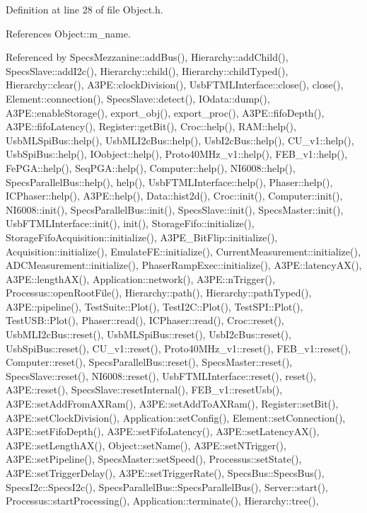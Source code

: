 Definition at line 28 of file Object.\+h.



References Object\+::m\+\_\+name.



Referenced by Specs\+Mezzanine\+::add\+Bus(), Hierarchy\+::add\+Child(), Specs\+Slave\+::add\+I2c(), Hierarchy\+::child(), Hierarchy\+::child\+Typed(), Hierarchy\+::clear(), A3\+P\+E\+::clock\+Division(), Usb\+F\+T\+M\+L\+Interface\+::close(), close(), Element\+::connection(), Specs\+Slave\+::detect(), I\+Odata\+::dump(), A3\+P\+E\+::enable\+Storage(), export\+\_\+obj(), export\+\_\+proc(), A3\+P\+E\+::fifo\+Depth(), A3\+P\+E\+::fifo\+Latency(), Register\+::get\+Bit(), Croc\+::help(), R\+A\+M\+::help(), Usb\+M\+L\+Spi\+Bus\+::help(), Usb\+M\+L\+I2c\+Bus\+::help(), Usb\+I2c\+Bus\+::help(), C\+U\+\_\+v1\+::help(), Usb\+Spi\+Bus\+::help(), I\+Oobject\+::help(), Proto40\+M\+Hz\+\_\+v1\+::help(), F\+E\+B\+\_\+v1\+::help(), Fe\+P\+G\+A\+::help(), Seq\+P\+G\+A\+::help(), Computer\+::help(), N\+I6008\+::help(), Specs\+Parallel\+Bus\+::help(), help(), Usb\+F\+T\+M\+L\+Interface\+::help(), Phaser\+::help(), I\+C\+Phaser\+::help(), A3\+P\+E\+::help(), Data\+::hist2d(), Croc\+::init(), Computer\+::init(), N\+I6008\+::init(), Specs\+Parallel\+Bus\+::init(), Specs\+Slave\+::init(), Specs\+Master\+::init(), Usb\+F\+T\+M\+L\+Interface\+::init(), init(), Storage\+Fifo\+::initialize(), Storage\+Fifo\+Acquisition\+::initialize(), A3\+P\+E\+\_\+\+Bit\+Flip\+::initialize(), Acquisition\+::initialize(), Emulate\+F\+E\+::initialize(), Current\+Measurement\+::initialize(), A\+D\+C\+Measurement\+::initialize(), Phaser\+Ramp\+Exec\+::initialize(), A3\+P\+E\+::latency\+A\+X(), A3\+P\+E\+::length\+A\+X(), Application\+::network(), A3\+P\+E\+::n\+Trigger(), Processus\+::open\+Root\+File(), Hierarchy\+::path(), Hierarchy\+::path\+Typed(), A3\+P\+E\+::pipeline(), Test\+Suite\+::\+Plot(), Test\+I2\+C\+::\+Plot(), Test\+S\+P\+I\+::\+Plot(), Test\+U\+S\+B\+::\+Plot(), Phaser\+::read(), I\+C\+Phaser\+::read(), Croc\+::reset(), Usb\+M\+L\+I2c\+Bus\+::reset(), Usb\+M\+L\+Spi\+Bus\+::reset(), Usb\+I2c\+Bus\+::reset(), Usb\+Spi\+Bus\+::reset(), C\+U\+\_\+v1\+::reset(), Proto40\+M\+Hz\+\_\+v1\+::reset(), F\+E\+B\+\_\+v1\+::reset(), Computer\+::reset(), Specs\+Parallel\+Bus\+::reset(), Specs\+Master\+::reset(), Specs\+Slave\+::reset(), N\+I6008\+::reset(), Usb\+F\+T\+M\+L\+Interface\+::reset(), reset(), A3\+P\+E\+::reset(), Specs\+Slave\+::reset\+Internal(), F\+E\+B\+\_\+v1\+::reset\+Usb(), A3\+P\+E\+::set\+Add\+From\+A\+X\+Ram(), A3\+P\+E\+::set\+Add\+To\+A\+X\+Ram(), Register\+::set\+Bit(), A3\+P\+E\+::set\+Clock\+Division(), Application\+::set\+Config(), Element\+::set\+Connection(), A3\+P\+E\+::set\+Fifo\+Depth(), A3\+P\+E\+::set\+Fifo\+Latency(), A3\+P\+E\+::set\+Latency\+A\+X(), A3\+P\+E\+::set\+Length\+A\+X(), Object\+::set\+Name(), A3\+P\+E\+::set\+N\+Trigger(), A3\+P\+E\+::set\+Pipeline(), Specs\+Master\+::set\+Speed(), Processus\+::set\+State(), A3\+P\+E\+::set\+Trigger\+Delay(), A3\+P\+E\+::set\+Trigger\+Rate(), Specs\+Bus\+::\+Specs\+Bus(), Specs\+I2c\+::\+Specs\+I2c(), Specs\+Parallel\+Bus\+::\+Specs\+Parallel\+Bus(), Server\+::start(), Processus\+::start\+Processing(), Application\+::terminate(), Hierarchy\+::tree(), 
